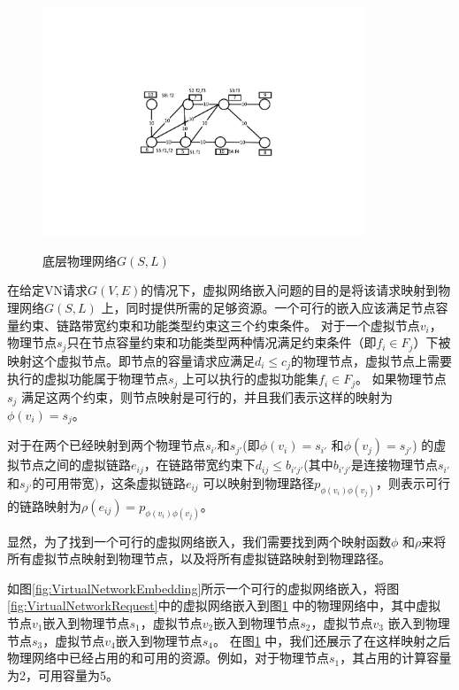 \begin{figure}[htbp]
\centering
\includegraphics[width=3.8in]{figures/PhysicalNetwork}\\
\caption{底层物理网络$G(S,L)$}\label{fig:PhysicalNetwork}
\end{figure}

在给定VN请求$G (V,E)$的情况下，虚拟网络嵌入问题的目的是将该请求映射到物理网络$G (S,L)$ 上，同时提供所需的足够资源。一个可行的嵌入应该满足节点容量约束、链路带宽约束和功能类型约束这三个约束条件。
对于一个虚拟节点$v_i$，物理节点$s_j$只在节点容量约束和功能类型两种情况满足约束条件（即${f_i} \in {F_j}$）下被映射这个虚拟节点。即节点的容量请求应满足$d_i\leq c_j$的物理节点，虚拟节点上需要执行的虚拟功能属于物理节点$s_j$ 上可以执行的虚拟功能集${f_i} \in {F_j}$。 如果物理节点$s_j$ 满足这两个约束，则节点映射是可行的，并且我们表示这样的映射为$\phi ({v_i}) = {s_j}$。

对于在两个已经映射到两个物理节点$s_{i'}$和$s_{j'}$(即$\phi({v_i}) = {s_{i'}}$ 和$\phi({v_j}) = {s_{j'}}$) 的虚拟节点之间的虚拟链路$e_{ij}$，在链路带宽约束下$d_{ij}\leq b_{i'j'}$(其中$b_{i'j'}$是连接物理节点$s_{i'}$ 和$s_{j'}$的可用带宽)，这条虚拟链路$e_{ij}$ 可以映射到物理路径$p_{\phi({v_i}) \phi({v_j})}$，则表示可行的链路映射为$\rho(e_{ij}) = p_{\phi({v_i}) \phi({v_j})}$。

显然，为了找到一个可行的虚拟网络嵌入，我们需要找到两个映射函数$\phi$ 和$\rho$来将所有虚拟节点映射到物理节点，以及将所有虚拟链路映射到物理路径。

如图\ref{fig:VirtualNetworkEmbedding}所示一个可行的虚拟网络嵌入，将图\ref{fig:VirtualNetworkRequest}中的虚拟网络嵌入到图\ref{fig:PhysicalNetwork} 中的物理网络中，其中虚拟节点$v_1$嵌入到物理节点$s_1$，虚拟节点$v_2$嵌入到物理节点$s_2$，虚拟节点$v_3$ 嵌入到物理节点$s_3$，虚拟节点$v_4$嵌入到物理节点$s_4$。 在图\ref{fig:PhysicalNetwork} 中，我们还展示了在这样映射之后物理网络中已经占用的和可用的资源。例如，对于物理节点$s_1$，其占用的计算容量为2，可用容量为5。

